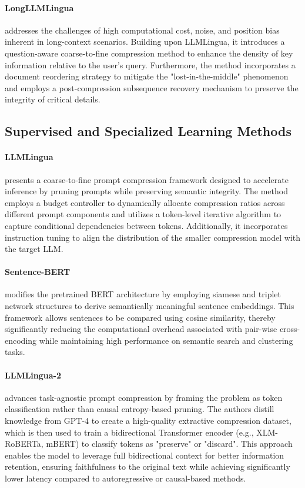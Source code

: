 \documentclass[11pt]{article}
\begin{document}
\paragraph{LongLLMLingua}\cite{jiang2024longllmlingua} addresses the challenges of high computational cost, noise, and position bias inherent in long-context scenarios. Building upon LLMLingua, it introduces a question-aware coarse-to-fine compression method to enhance the density of key information relative to the user's query. Furthermore, the method incorporates a document reordering strategy to mitigate the "lost-in-the-middle" phenomenon and employs a post-compression subsequence recovery mechanism to preserve the integrity of critical details.

\subsection{Supervised and Specialized Learning Methods}

\paragraph{LLMLingua}\cite{jiang2023llmlingua} presents a coarse-to-fine prompt compression framework designed to accelerate inference by pruning prompts while preserving semantic integrity. The method employs a budget controller to dynamically allocate compression ratios across different prompt components and utilizes a token-level iterative algorithm to capture conditional dependencies between tokens. Additionally, it incorporates instruction tuning to align the distribution of the smaller compression model with the target LLM.

\paragraph{Sentence-BERT}\cite{reimers2019sentence} modifies the pretrained BERT architecture by employing siamese and triplet network structures to derive semantically meaningful sentence embeddings. This framework allows sentences to be compared using cosine similarity, thereby significantly reducing the computational overhead associated with pair-wise cross-encoding while maintaining high performance on semantic search and clustering tasks.

\paragraph{LLMLingua-2}\cite{pan2024llmlingua2} advances task-agnostic prompt compression by framing the problem as token classification rather than causal entropy-based pruning. The authors distill knowledge from GPT-4 to create a high-quality extractive compression dataset, which is then used to train a bidirectional Transformer encoder (e.g., XLM-RoBERTa, mBERT) to classify tokens as "preserve" or "discard". This approach enables the model to leverage full bidirectional context for better information retention, ensuring faithfulness to the original text while achieving significantly lower latency compared to autoregressive or causal-based methods.
\end{document}
